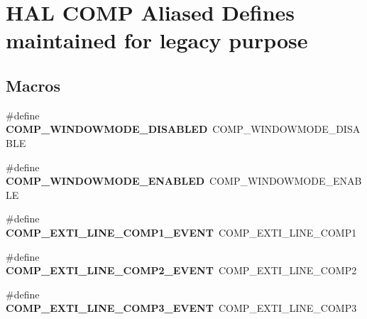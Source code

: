 \hypertarget{group___h_a_l___c_o_m_p___aliased___defines}{\section{H\-A\-L C\-O\-M\-P Aliased Defines maintained for legacy purpose}
\label{group___h_a_l___c_o_m_p___aliased___defines}
}
\subsection*{Macros}
\begin{DoxyCompactItemize}
\item 
\hypertarget{group___h_a_l___c_o_m_p___aliased___defines_gab9e0400639ad2179b63e519e08741c05}{\#define {\bfseries C\-O\-M\-P\-\_\-\-W\-I\-N\-D\-O\-W\-M\-O\-D\-E\-\_\-\-D\-I\-S\-A\-B\-L\-E\-D}~C\-O\-M\-P\-\_\-\-W\-I\-N\-D\-O\-W\-M\-O\-D\-E\-\_\-\-D\-I\-S\-A\-B\-L\-E}\label{group___h_a_l___c_o_m_p___aliased___defines_gab9e0400639ad2179b63e519e08741c05}

\item 
\hypertarget{group___h_a_l___c_o_m_p___aliased___defines_gab481c80a4a4235ca54d2dd39db70926c}{\#define {\bfseries C\-O\-M\-P\-\_\-\-W\-I\-N\-D\-O\-W\-M\-O\-D\-E\-\_\-\-E\-N\-A\-B\-L\-E\-D}~C\-O\-M\-P\-\_\-\-W\-I\-N\-D\-O\-W\-M\-O\-D\-E\-\_\-\-E\-N\-A\-B\-L\-E}\label{group___h_a_l___c_o_m_p___aliased___defines_gab481c80a4a4235ca54d2dd39db70926c}

\item 
\hypertarget{group___h_a_l___c_o_m_p___aliased___defines_gaa53df1592afaa8d2a7d2f417273a50a7}{\#define {\bfseries C\-O\-M\-P\-\_\-\-E\-X\-T\-I\-\_\-\-L\-I\-N\-E\-\_\-\-C\-O\-M\-P1\-\_\-\-E\-V\-E\-N\-T}~C\-O\-M\-P\-\_\-\-E\-X\-T\-I\-\_\-\-L\-I\-N\-E\-\_\-\-C\-O\-M\-P1}\label{group___h_a_l___c_o_m_p___aliased___defines_gaa53df1592afaa8d2a7d2f417273a50a7}

\item 
\hypertarget{group___h_a_l___c_o_m_p___aliased___defines_gae128dfe3b90b2c0e51cde7de5987f9ef}{\#define {\bfseries C\-O\-M\-P\-\_\-\-E\-X\-T\-I\-\_\-\-L\-I\-N\-E\-\_\-\-C\-O\-M\-P2\-\_\-\-E\-V\-E\-N\-T}~C\-O\-M\-P\-\_\-\-E\-X\-T\-I\-\_\-\-L\-I\-N\-E\-\_\-\-C\-O\-M\-P2}\label{group___h_a_l___c_o_m_p___aliased___defines_gae128dfe3b90b2c0e51cde7de5987f9ef}

\item 
\hypertarget{group___h_a_l___c_o_m_p___aliased___defines_ga30c7118ab9b9cbfa8e40870ee9e747b6}{\#define {\bfseries C\-O\-M\-P\-\_\-\-E\-X\-T\-I\-\_\-\-L\-I\-N\-E\-\_\-\-C\-O\-M\-P3\-\_\-\-E\-V\-E\-N\-T}~C\-O\-M\-P\-\_\-\-E\-X\-T\-I\-\_\-\-L\-I\-N\-E\-\_\-\-C\-O\-M\-P3}\label{group___h_a_l___c_o_m_p___aliased___defines_ga30c7118ab9b9cbfa8e40870ee9e747b6}


\end{DoxyCompactItemize}
